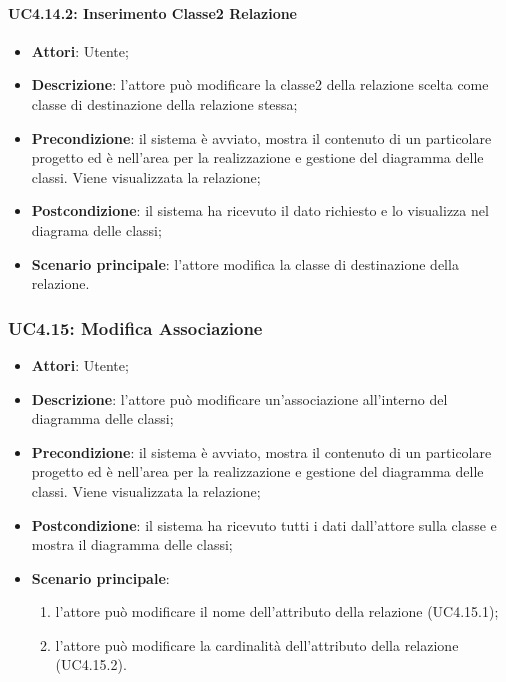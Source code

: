 \paragraph{UC4.14.2: Inserimento Classe2 Relazione}
\label{UC4.14.2}
\begin{itemize}
	\item \textbf{Attori}: Utente;
	\item \textbf{Descrizione}: l'attore può modificare la classe2 della relazione scelta come classe di destinazione della relazione stessa;
	\item \textbf{Precondizione}: il sistema è avviato, mostra il contenuto di un particolare progetto ed è nell'area per la realizzazione e gestione del diagramma delle classi. Viene visualizzata la relazione;
	\item \textbf{Postcondizione}: il sistema ha ricevuto il dato richiesto e lo visualizza nel diagrama delle classi;
	\item \textbf{Scenario principale}: l'attore modifica la classe di destinazione della relazione.
\end{itemize}

\subsubsection{UC4.15: Modifica Associazione}
\label{UC4.15}
\begin{itemize}
	\item \textbf{Attori}: Utente;
	\item \textbf{Descrizione}: l'attore può modificare un'associazione all'interno del diagramma delle classi;
	\item \textbf{Precondizione}: il sistema è avviato, mostra il contenuto di un particolare progetto ed è nell'area per la realizzazione e gestione del diagramma delle classi. Viene visualizzata la relazione;
	\item \textbf{Postcondizione}: il sistema ha ricevuto tutti i dati dall'attore sulla classe e mostra il diagramma delle classi;
	\item \textbf{Scenario principale}:
	\begin{enumerate}
		\item l'attore può modificare il nome dell'attributo della relazione (UC4.15.1);
		\item l'attore può modificare la cardinalità dell'attributo della relazione (UC4.15.2).
	\end{enumerate}
\end{itemize}

